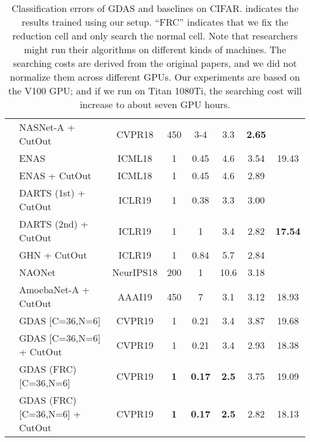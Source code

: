 \documentclass[10pt,twocolumn,letterpaper]{article}
\begin{document}
\begin{table*}[t!]
\begin{tabular}{| c | l | c | c | c | c | c | c |}
    &  NASNet-A + CutOut~\cite{Zoph_2018_CVPR}          & CVPR18  & 450  & 3-4         & 3.3  & \textbf{2.65} &  \\
    &  ENAS~\cite{pmlr-v80-pham18a}                     & ICML18  & 1    & 0.45        & 4.6  & 3.54          &  19.43 \\
    &  ENAS + CutOut~\cite{pmlr-v80-pham18a}            & ICML18  & 1    & 0.45        & 4.6  & 2.89          &   \\
&  DARTS (1st) + CutOut~\cite{liu2019darts}   & ICLR19  & 1    & 0.38   & 3.3   & 3.00          &  \\
    &  DARTS (2nd) + CutOut~\cite{liu2019darts}   & ICLR19  & 1    & 1           & 3.4  & 2.82          & \textbf{17.54} \\
&  GHN + CutOut~\cite{zhang2019graph}               & ICLR19  & 1    & 0.84        & 5.7  & 2.84          &  \\
    &  NAONet~\cite{luo2018neural}                      & NeurIPS18  & 200  & 1           & 10.6 & 3.18          &  \\
    &  AmoebaNet-A + CutOut~\cite{real2019regularized}  & AAAI19 & 450  & 7           & 3.1  & 3.12          & 18.93 \\
    \cline{2-8}
    & GDAS [C=36,N=6]                                   & CVPR19 & 1    & 0.21        & 3.4  & 3.87          & 19.68 \\
    & GDAS [C=36,N=6] + CutOut                          & CVPR19 & 1    & 0.21        & 3.4  & 2.93          & 18.38 \\
    & GDAS (FRC) [C=36,N=6]                             & CVPR19 & \textbf{1} & \textbf{0.17} & \textbf{2.5}  &  3.75   & 19.09 \\
    & GDAS (FRC) [C=36,N=6] + CutOut                    & CVPR19 & \textbf{1} & \textbf{0.17} & \textbf{2.5}  &  2.82   & 18.13 \\
    \hline
    \hline
\end{tabular}
\vspace{2mm}
\caption{
Classification errors of GDAS and baselines on CIFAR.
 indicates the results trained using our setup.
``FRC'' indicates that we fix the reduction cell and only search the normal cell.
Note that researchers might run their algorithms on different kinds of machines.
The searching costs are derived from the original papers, and we did not normalize them across different GPUs. Our experiments are based on the V100 GPU; and if we run on Titan 1080Ti, the searching cost will increase to about seven GPU hours.
}
\vspace{-2mm}
\label{table:CIFAR}
\end{table*}
\end{document}
